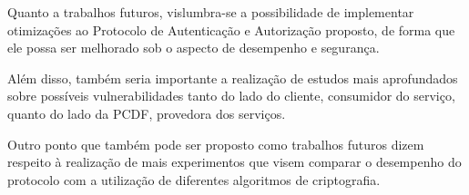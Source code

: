 Quanto a trabalhos futuros, vislumbra-se a possibilidade de implementar otimizações ao Protocolo de Autenticação e Autorização proposto, de forma que ele possa ser melhorado sob o aspecto de desempenho e segurança.

Além disso, também seria importante a realização de estudos mais aprofundados sobre possíveis vulnerabilidades tanto do lado do cliente, consumidor do serviço, quanto do lado da PCDF, provedora dos serviços.

Outro ponto que também pode ser proposto como trabalhos futuros dizem respeito à realização de mais experimentos que visem comparar o desempenho do protocolo com a utilização de diferentes algoritmos de criptografia.






